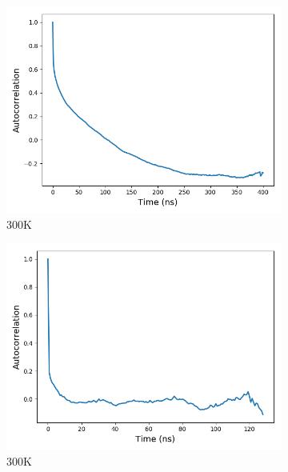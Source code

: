 \documentclass[journal=jpcbfk,manusciprt=article]{achemso}
\begin{document}

  \begin{figure}[!htb]
  \centering
  \begin{subfigure}{0.45\textwidth}
  	\centering
  	\includegraphics[width=\textwidth]{dihedral_autocorrelation_300K.png}
  	\caption{300K}\label{fig:dihedrals_300K}
  \end{subfigure}
  \begin{subfigure}{0.45\textwidth}
  	\centering
  	\includegraphics[width=\textwidth]{dihedral_autocorrelation_500K.png}
  	\caption{300K}\label{fig:dihedrals_500K}
  \end{subfigure}
  \caption{}\label{fig:dihedrals}
  \end{figure}
  
\end{document}
